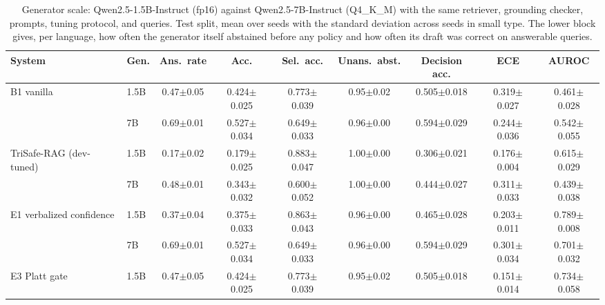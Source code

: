 \begin{table}[t]
  \caption{Generator scale: Qwen2.5-1.5B-Instruct (fp16) against Qwen2.5-7B-Instruct (Q4\_K\_M) with the same retriever, grounding checker, prompts, tuning protocol, and queries. Test split, mean over seeds with the standard deviation across seeds in small type. The lower block gives, per language, how often the generator itself abstained before any policy and how often its draft was correct on answerable queries.}
  \label{tab:scaling}
  \footnotesize
  \setlength{\tabcolsep}{3.5pt}
  \begin{tabular}{llccccccc}
    \toprule
    System & Gen. & Ans.\ rate & Acc. & Sel.\ acc. & Unans.\ abst. & Decision acc. & ECE & AUROC \\
    \midrule
    B1 vanilla & 1.5B & 0.47{\scriptsize$\pm$0.05} & 0.424{\scriptsize$\pm$0.025} & 0.773{\scriptsize$\pm$0.039} & 0.95{\scriptsize$\pm$0.02} & 0.505{\scriptsize$\pm$0.018} & 0.319{\scriptsize$\pm$0.027} & 0.461{\scriptsize$\pm$0.028} \\
     & 7B & 0.69{\scriptsize$\pm$0.01} & 0.527{\scriptsize$\pm$0.034} & 0.649{\scriptsize$\pm$0.033} & 0.96{\scriptsize$\pm$0.00} & 0.594{\scriptsize$\pm$0.029} & 0.244{\scriptsize$\pm$0.036} & 0.542{\scriptsize$\pm$0.055} \\
    \addlinespace
    TriSafe-RAG (dev-tuned) & 1.5B & 0.17{\scriptsize$\pm$0.02} & 0.179{\scriptsize$\pm$0.025} & 0.883{\scriptsize$\pm$0.047} & 1.00{\scriptsize$\pm$0.00} & 0.306{\scriptsize$\pm$0.021} & 0.176{\scriptsize$\pm$0.004} & 0.615{\scriptsize$\pm$0.029} \\
     & 7B & 0.48{\scriptsize$\pm$0.01} & 0.343{\scriptsize$\pm$0.032} & 0.600{\scriptsize$\pm$0.052} & 1.00{\scriptsize$\pm$0.00} & 0.444{\scriptsize$\pm$0.027} & 0.311{\scriptsize$\pm$0.033} & 0.439{\scriptsize$\pm$0.038} \\
    \addlinespace
    E1 verbalized confidence & 1.5B & 0.37{\scriptsize$\pm$0.04} & 0.375{\scriptsize$\pm$0.033} & 0.863{\scriptsize$\pm$0.043} & 0.96{\scriptsize$\pm$0.00} & 0.465{\scriptsize$\pm$0.028} & 0.203{\scriptsize$\pm$0.011} & 0.789{\scriptsize$\pm$0.008} \\
     & 7B & 0.69{\scriptsize$\pm$0.01} & 0.527{\scriptsize$\pm$0.034} & 0.649{\scriptsize$\pm$0.033} & 0.96{\scriptsize$\pm$0.00} & 0.594{\scriptsize$\pm$0.029} & 0.301{\scriptsize$\pm$0.034} & 0.701{\scriptsize$\pm$0.032} \\
    \addlinespace
    E3 Platt gate & 1.5B & 0.47{\scriptsize$\pm$0.05} & 0.424{\scriptsize$\pm$0.025} & 0.773{\scriptsize$\pm$0.039} & 0.95{\scriptsize$\pm$0.02} & 0.505{\scriptsize$\pm$0.018} & 0.151{\scriptsize$\pm$0.014} & 0.734{\scriptsize$\pm$0.058} \\

\end{tabular}
\end{table}
